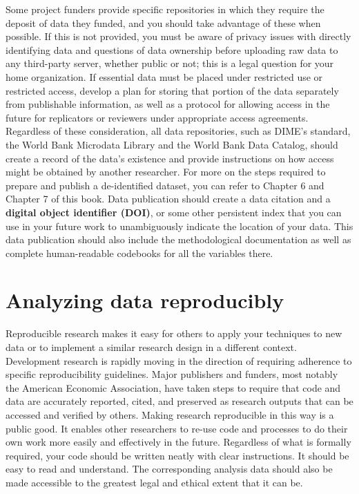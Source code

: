 Some project funders
provide specific repositories in which they require the deposit of data they funded,
and you should take advantage of these when possible.
If this is not provided, you must be aware of privacy issues
with directly identifying data and questions of data ownership
before uploading raw data to any third-party server, whether public or not;
this is a legal question for your home organization.
If essential data must be placed under restricted use or restricted access,
develop a plan for storing that portion of the data
separately from publishable information,
as well as a protocol for allowing access in the future
for replicators or reviewers under appropriate access agreements.
Regardless of these consideration, all data repositories,
such as DIME's standard, the World Bank Microdata Library
and the World Bank Data Catalog,
should create a record of the data's existence
and provide instructions on how access might be obtained by another researcher.
For more on the steps required to prepare and publish a de-identified dataset,
you can refer to Chapter 6 and Chapter 7 of this book.
Data publication should create a data citation and a \textbf{digital object identifier (DOI)},
or some other persistent index that you can use in your future work
to unambiguously indicate the location of your data.
This data publication should also include the methodological documentation
as well as complete human-readable codebooks for all the variables there.

\section{Analyzing data reproducibly}

Reproducible research makes it easy
for others to apply your techniques to new data
or to implement a similar research design in a different context.
Development research is rapidly moving in the direction of requiring adherence
to specific reproducibility guidelines.
Major publishers and funders, most notably the American Economic Association,
have taken steps to require that code and data
are accurately reported, cited, and preserved as research outputs
that can be accessed and verified by others.
Making research reproducible in this way is a public good.
It enables other researchers to re-use code and processes
to do their own work more easily and effectively in the future.
Regardless of what is formally required,
your code should be written neatly with clear instructions.
It should be easy to read and understand.
The corresponding analysis data should also be made accessible
to the greatest legal and ethical extent that it can be.

